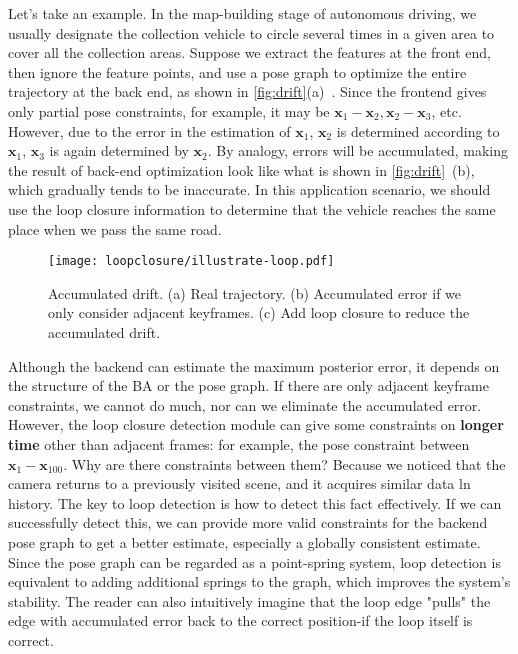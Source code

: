 Let's take an example. In the map-building stage of autonomous driving, we usually designate the collection vehicle to circle several times in a given area to cover all the collection areas. Suppose we extract the features at the front end, then ignore the feature points, and use a pose graph to optimize the entire trajectory at the back end, as shown in \autoref{fig:drift}(a)~. Since the frontend gives only partial pose constraints, for example, it may be $\mathbf{x}_1-\mathbf{x}_2, \mathbf{x}_2-\mathbf{x}_3$, etc. However, due to the error in the estimation of $\mathbf{x}_1$, $\mathbf{x}_2$ is determined according to $\mathbf{x}_1$, $\mathbf{x}_3$ is again determined by $ \mathbf{x}_2$. By analogy, errors will be accumulated, making the result of back-end optimization look like what is shown in \autoref{fig:drift}~(b), which gradually tends to be inaccurate. In this application scenario, we should use the loop closure information to determine that the vehicle reaches the same place when we pass the same road.

\begin{figure}[!htp]
	\centering
	\texttt{[image: loopclosure/illustrate-loop.pdf]}
	\caption{Accumulated drift. (a) Real trajectory. (b) Accumulated error if we only consider adjacent keyframes. (c) Add loop closure to reduce the accumulated drift. }
	\label{fig:drift}
\end{figure}

Although the backend can estimate the maximum posterior error, it depends on the structure of the BA or the pose graph. If there are only adjacent keyframe constraints, we cannot do much, nor can we eliminate the accumulated error. However, the loop closure detection module can give some constraints on \textbf{longer time} other than adjacent frames: for example, the pose constraint between $\mathbf{x}_1-\mathbf{x}_{100}$. Why are there constraints between them? Because we noticed that the camera returns to a previously visited scene, and it acquires similar data ln history. The key to loop detection is how to detect this fact effectively. If we can successfully detect this, we can provide more valid constraints for the backend pose graph to get a better estimate, especially a globally consistent estimate. Since the pose graph can be regarded as a point-spring system, loop detection is equivalent to adding additional springs to the graph, which improves the system's stability. The reader can also intuitively imagine that the loop edge "pulls" the edge with accumulated error back to the correct position-if the loop itself is correct.


